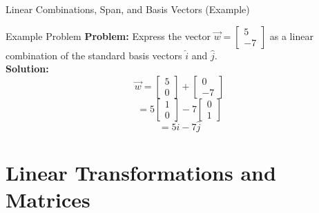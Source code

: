 \documentclass[10pt, aspectratio=169]{beamer}
\begin{document}
\begin{frame}{Linear Combinations, Span, and Basis Vectors (Example)}
    \begin{exampleblock}{Example Problem}
        \textbf{Problem:} Express the vector $\vec{w} = \begin{bmatrix} 5 \\ -7 \end{bmatrix}$ as a linear combination of the standard basis vectors $\hat{i}$ and $\hat{j}$. \\
        \vspace{0.5cm}
        \textbf{Solution:}
        $$\vec{w} = \begin{bmatrix} 5 \\ 0 \end{bmatrix} + \begin{bmatrix} 0 \\ -7 \end{bmatrix}$$
        $$= 5\begin{bmatrix} 1 \\ 0 \end{bmatrix} - 7\begin{bmatrix} 0 \\ 1 \end{bmatrix}$$
        $$= 5\hat{i} - 7\hat{j}$$
    \end{exampleblock}
\end{frame}

\section{Linear Transformations and Matrices}
\end{document}
